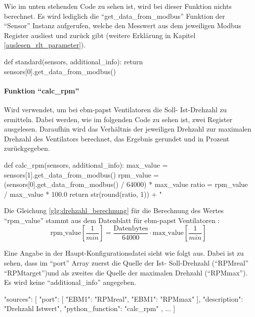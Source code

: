 Wie im unten stehenden Code zu sehen ist, wird bei dieser Funktion nichts berechnet. Es wird lediglich die \enquote{get\_data\_from\_modbus} Funktion der \enquote{Sensor} Instanz aufgerufen, welche den Messwert aus dem jeweiligen Modbus Register ausliest und zurück gibt (weitere Erklärung in Kapitel \ref{auslesen_rlt_parameter}).

\begin{pythoncode}
def standard(sensors, additional_info):
	return sensors[0].get_data_from_modbus()
\end{pythoncode}


\paragraph{Funktion \enquote{calc\_rpm}}
Wird verwendet, um bei ebm-papst Ventilatoren die Soll- \bzw Ist-Drehzahl zu ermitteln. Dabei werden, wie im folgenden Code zu sehen ist, zwei Register ausgelesen. Daraufhin wird das Verhältnis der jeweiligen Drehzahl zur maximalen Drehzahl des Ventilators berechnet, das Ergebnis gerundet und in Prozent zurückgegeben.

\begin{pythoncode}
def calc_rpm(sensors, additional_info):
	max_value = sensors[1].get_data_from_modbus()
	rpm_value = (sensors[0].get_data_from_modbus() / 64000) * max_value
	ratio = rpm_value / max_value * 100.0
	return str(round(ratio, 1)) + " %
\end{pythoncode}

Die Gleichung \eqref{glg:drehzahl_berechnung} für die Berechnung des Wertes \enquote{rpm\_value} stammt aus dem Datenblatt für ebm-papst Ventilatoren \cite[vgl.][118,122]{ebmpapst:2020}: 
\begin{equation}
	\text{rpm\_value}\left[\frac{1}{min}\right] = \frac{\text{Datenbytes}}{64000} \cdot \text{max\_value} \left[\frac{1}{min}\right]
	\label{glg:drehzahl_berechnung}
\end{equation} 

Eine Angabe in der Haupt-Konfigurationsdatei sieht wie folgt aus. Dabei ist zu sehen, dass im \enquote{port} Array zuerst die Quelle der Ist- \bzw Soll-Drehzahl (\enquote{RPMreal} \bzw \enquote{RPMtarget})und als zweites die Quelle der maximalen Drehzahl (\enquote{RPMmax}). Es wird keine \enquote{additional\_info} angegeben.

\begin{jsoncode}
"sources": [
	{
		"port": [
			{"EBM1": "RPMreal"},
			{"EBM1": "RPMmax"}
		],
		"description": "Drehzahl Istwert",
		"python_function": "calc_rpm"
	},
	...
]
\end{jsoncode}



